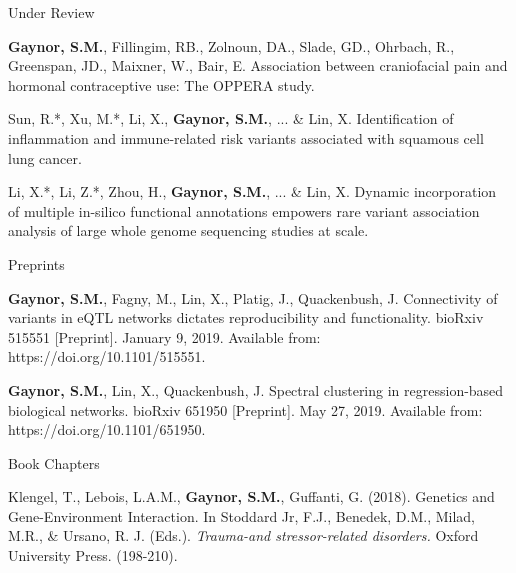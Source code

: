 Under Review

\begin{cvpapers}

\cvpaper
{\textbf{Gaynor, S.M.}, Fillingim, RB., Zolnoun, DA., Slade, GD., Ohrbach, R., Greenspan, JD., Maixner, W., Bair, E.  Association between craniofacial pain and hormonal contraceptive use: The OPPERA study.} %
{} %
{ } %
{} %

\cvpaper
{Sun, R.*, Xu, M.*, Li, X., \textbf{Gaynor, S.M.}, ... \& Lin, X.  Identification of inflammation and immune-related risk variants associated with squamous cell lung cancer.} %
{} %
{ } %
{} %

\cvpaper
{Li, X.*, Li, Z.*, Zhou, H., \textbf{Gaynor, S.M.}, ... \& Lin, X.  Dynamic incorporation of multiple in-silico functional annotations empowers rare variant association analysis of large whole genome sequencing studies at scale.} %
{} %
{ } %
{} %



\end{cvpapers}

Preprints


\begin{cvpapers}
	
	\cvpaper
	{\textbf{Gaynor, S.M.}, Fagny, M., Lin, X., Platig, J., Quackenbush, J. Connectivity of variants in eQTL networks dictates reproducibility and functionality. bioRxiv 515551 [Preprint]. January 9, 2019. Available from: https://doi.org/10.1101/515551.} %
	{} %
	{ } %
	{} %
	
	\cvpaper
	{\textbf{Gaynor, S.M.}, Lin, X., Quackenbush, J. Spectral clustering in regression-based biological networks. bioRxiv 651950 [Preprint]. May 27, 2019. Available from: https://doi.org/10.1101/651950.} %
	{} %
	{ } %
	{} %
	

	
\end{cvpapers}




Book Chapters


\begin{cvpapers}
	
	\cvpaper
	{Klengel, T., Lebois, L.A.M., 	\textbf{Gaynor, S.M.}, Guffanti, G. (2018). Genetics and Gene-Environment Interaction. In Stoddard Jr, F.J., Benedek, D.M., Milad, M.R., \& Ursano, R. J. (Eds.). \textit{Trauma-and stressor-related disorders.} Oxford University Press. (198-210).} %
	{} %
	{ } %
	{} %
	
	
	
\end{cvpapers}